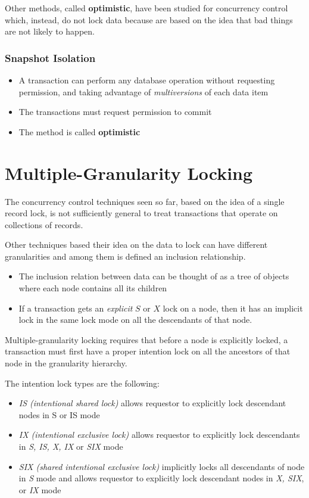 Other methods, called \textbf{optimistic}, have been studied for concurrency control which, instead, do not lock data because are based on the idea that bad things are not likely to happen.

\subsubsection{Snapshot Isolation}
\begin{itemize}
    \item A transaction can perform any database operation without requesting permission, and taking advantage of \textit{multiversions} of each data item
    \item The transactions must request permission to commit
    \item The method is called \textbf{optimistic}
\end{itemize}

\section{Multiple-Granularity Locking}
The concurrency control techniques seen so far, based on the idea of a single record lock, is not sufficiently general to treat transactions that operate on collections of records.

Other techniques based their idea on the data to lock can have different granularities and among them is defined an inclusion relationship.
\begin{itemize}
    \item The inclusion relation between data can be thought of as a tree of objects where each node contains all its children
    \item If a transaction gets an \textit{explicit} $S$ or $X$ lock on a node, then it has an implicit lock in the same lock mode on all the descendants of that node.
\end{itemize}

\begin{tcolorbox}
Multiple-granularity locking requires that before a node is explicitly locked, a transaction must first have a proper intention lock on all the ancestors of that node in the granularity hierarchy.
\end{tcolorbox}
The intention lock types are the following:
\begin{itemize}
    \item \textit{IS (intentional shared lock)} allows requestor to explicitly lock descendant nodes in S or IS mode
    \item \textit{IX (intentional exclusive lock)} allows requestor to explicitly lock descendants in \textit{S, IS, X, IX} or \textit{SIX} mode
    \item \textit{SIX (shared intentional exclusive lock)} implicitly locks all descendants of node in \textit{S} mode and allows requestor to explicitly lock descendant nodes in \textit{X, SIX}, or \textit{IX} mode
\end{itemize}

